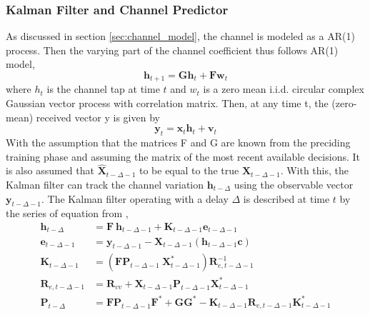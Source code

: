 \subsubsection{Kalman Filter and Channel Predictor}
As discussed in section \ref{sec:channel_model}, the channel is modeled as a AR(1) process. Then the varying part of the channel coefficient thus follows AR(1) model, 
\begin{equation} 
\boldsymbol{h} _{t+1}  = \boldsymbol{G} \boldsymbol{h} _{t} + \boldsymbol{F} \boldsymbol{w} _{t}
\end{equation}
where $h_t$ is the channel tap at time $t$ and $w_t$ is a zero mean i.i.d. circular complex Gaussian vector process with correlation matrix.
Then, at any time t, the (zero-mean) received vector y is given by
\begin{equation} 
\boldsymbol{y} _{t}  = \boldsymbol{x} _{t} \boldsymbol{h} _{t} + \boldsymbol{v} _{t}
\end{equation}
With the assumption that the matrices F and G are known from the preciding training phase and assuming the matrix of the most recent available decisions.
It is also assumed that $\hat{\boldsymbol{X}} _{t- \Delta -1} $ to be equal to the true $ \boldsymbol{X} _{t-\Delta-1} $.
With this, the Kalman filter can track the channel variation $\boldsymbol{h} _{t-\Delta} $ using the observable vector 
$\boldsymbol{y} _{t-\Delta-1} $.
The Kalman filter operating with a delay $\Delta$ is described at time $t$ by the series of equation from \cite{linearestimation}, 
\begin{equation}
\label{eq:kalman}
\begin{split}
\boldsymbol{h} _{t-\Delta} &= \boldsymbol{F} \ \boldsymbol{h} _{t-\Delta-1} + \boldsymbol{K} _{t-\Delta-1} \boldsymbol{e} _{t-\Delta-1} \\
\boldsymbol{e} _{t-\Delta-1} &= \boldsymbol{y} _{t-\Delta-1} - \boldsymbol{X} _{t-\Delta-1} (\boldsymbol{h} _{t-\Delta-1} \boldsymbol{c} ) \\
\boldsymbol{K} _{t-\Delta-1} &= (\boldsymbol{F} \boldsymbol{P} _{t-\Delta-1} \ \boldsymbol{X} _{t-\Delta-1}^{*}) \boldsymbol{R} _{e,t-\Delta-1}^{-1} \\
\boldsymbol{R} _{e,t-\Delta-1} &= \boldsymbol{R} _{vv} + \boldsymbol{X} _{t-\Delta-1} \boldsymbol{P} _{t-\Delta-1} \boldsymbol{X} _{t-\Delta-1}^{*} \\
\boldsymbol{P} _{t-\Delta} &= \boldsymbol{F} \boldsymbol{P} _{t-\Delta-1} \boldsymbol{F}^{*} + \boldsymbol{G} \boldsymbol{G}^{*} - \boldsymbol{K} _{t-\Delta-1} \boldsymbol{R} _{e,t-\Delta-1} \boldsymbol{K} _{t-\Delta-1} ^{*}
\end{split}
\end{equation}
